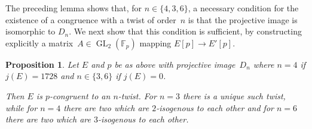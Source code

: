 \documentclass[12pt, reqno]{amsart}
\newcommand{\F}{\mathbb{F}}
\newcommand{\GL}{\operatorname{GL}}
\numberwithin{equation}{section}
\newtheorem{proposition}[theorem]{Proposition}
\theoremstyle{definition}
\theoremstyle{remark}
\begin{document}
The preceding lemma shows that, for $n\in\{4,3,6\}$, a necessary
condition for the existence of a congruence with a twist of order~$n$
is that the projective image is isomorphic to $D_n$.  We next show
that this condition is sufficient, by constructing explicitly a
matrix~$A\in\GL_2(\F_p)$ mapping $E[p]\to E'[p]$.

\begin{proposition}
Let $E$ and $p$ be as above with projective image~$D_n$ where $n=4$ if
$j(E)=1728$ and $n\in\{3,6\}$ if $j(E)=0$.

Then $E$ is $p$-congruent to an $n$-twist.  For $n=3$ there is a
unique such twist, while for $n=4$ there are two which are
$2$-isogenous to each other and for $n=6$ there are two which are
$3$-isogenous to each other.
\end{proposition}
\end{document}

